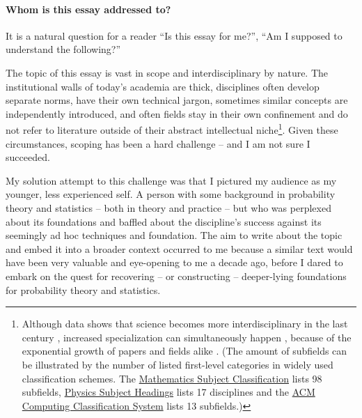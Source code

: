 \documentclass{article}
\begin{document}
\paragraph{Whom is this essay addressed to?}
It is a natural question for a reader ``Is this essay for me?'', ``Am I supposed to understand the following?''

The topic of this essay is vast in scope and interdisciplinary by nature.
The institutional walls of today's academia are thick, disciplines often develop separate norms, have their own technical jargon, sometimes similar concepts are independently introduced, and often fields stay in their own confinement and do not refer to literature outside of their abstract intellectual niche\footnote{Although data shows that science becomes more interdisciplinary in the last century \cite{paper:NaturePapersInterdisciplinary,paper:ACenturyOfPhysics,book:AtlasOfKnowledge}, increased specialization can simultaneously happen \cite{paper:BurdenOfKnowledge}, because of the exponential growth of papers and fields alike \cite{book:AcademicTribesAndTerritories}. (The amount of subfields can be illustrated by the number of listed first-level categories in widely used classification schemes. The \href{https://mathscinet.ams.org/mathscinet/msc/msc2020.html}{Mathematics Subject Classification} lists 98 subfields, \href{https://physh.org/browse}{Physics Subject Headings} lists 17 disciplines and the \href{https://dl.acm.org/ccs}{ACM Computing Classification System} lists 13 subfields.)}.
Given these circumstances, scoping has been a hard challenge -- and I am not sure I succeeded.

My solution attempt to this challenge was that I pictured my audience as my younger, less experienced self. A person with some background in probability theory and statistics -- both in theory and practice -- but who was perplexed about its foundations and baffled about the discipline's success against its seemingly ad hoc techniques and foundation.
The aim to write about the topic and embed it into a broader context occurred to me because a similar text would have been very valuable and eye-opening to me a decade ago, before I dared to embark on the quest for recovering -- or constructing -- deeper-lying foundations for probability theory and statistics.
\end{document}
